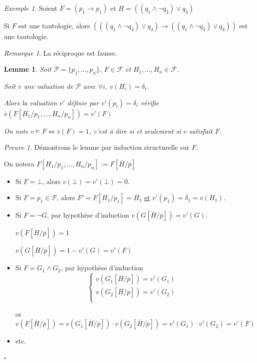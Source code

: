 \documentclass[]{article}
\newtheorem{mylemma}{Lemme}
\theoremstyle{remark}
\newtheorem{myrem}{Remarque}
\newtheorem{myproof}{Preuve}
\newtheorem{myexmpl}{Exemple}
\theoremstyle{definition}
\newcommand{\cqfd}{
	\hfill$\square$
}
\begin{document}
\begin{myexmpl}
	Soient $F = (p_1 \longrightarrow p_1)$ et $H=((q_1 \land \neg q_3) \lor q_3)$
	
	Si $F$ est une tautologie, alors $(((q_1 \land \neg q_3) \lor q_3) \longrightarrow ((q_1 \land \neg q_3) \lor q_3))$ est une tautologie.
\end{myexmpl}

\begin{myrem}
	La réciproque est fausse.
\end{myrem}

\begin{mylemma}
	Soit $\mathcal{P}=\{p_1, ..., p_n\}$, $F \in \mathcal{F}$ et $H_1,..., H_n \in \mathcal{F}$.
	
	Soit $v$ une valuation de $\mathcal{P}$ avec $\forall i, ~ v(H_i)=\delta_i$. 
	
	Alors la valuation $v'$ définie par $v'(p_i)=\delta_i$ vérifie $\overline{v}(F[H_1/p_1,...,H_n/p_n])=\overline{v'}(F)$
	
	On note $v \models F \Longleftrightarrow \overline{v}(F)=1$, c'est à dire si et seulement si $v$ satisfait $F$.
\end{mylemma}

\begin{myproof}
	Démontrons le lemme par induction structurelle sur $F$.
	
	On notera $F[H_1/p_1, ..., H_n/p_n]:=F[\overline{H}/\overline{p}]$
	
	\begin{itemize}
		\item Si $F = \bot$, alors $v(\bot)=v'(\bot)=0$.
		
		\item Si $F=p_1 \in \mathcal{P}$, alors $F'=F[H_1/p_1]=H_1$ \underline{et} $v'(p_1)=\delta_1=v(H_1)$.
		
		\item Si $F=\neg G$, par hypothèse d'induction $v(G[\overline{H}/\overline{p}])=v'(G)$.
		
		$v(F[\overline{H}/\overline{p}])=1$
		
		$v(G[\overline{H}/\overline{p}])=1 - v'(G) = v'(F)$
		
		\item Si $F=G_1 \land G_2$, par hypothèse d'induction
		$$
			\left\{
			\begin{array}{l}
				v(G_1[\overline{H}/\overline{p}])=v'(G_1) \\
				v(G_2[\overline{H}/\overline{p}])=v'(G_2) \\
			\end{array}
			\right.
		$$
		
		or $v(F[\overline{H}/\overline{p}])=v(G_1[\overline{H}/\overline{p}]) \cdot v(G_2[\overline{H}/\overline{p}]) = v'(G_1) \cdot v'(G_2)=v'(F)$
		
		\item etc.
	\end{itemize}
	\cqfd
\end{myproof}
\end{document}
